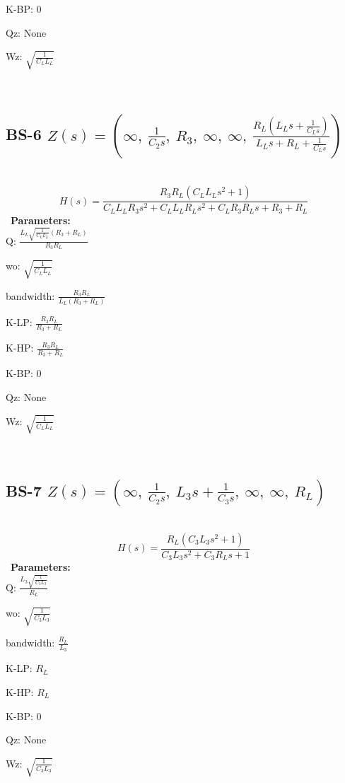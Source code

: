 \documentclass{article}
\begin{document}
K-BP: $0$\ 

Qz: $\text{None}$\ 

Wz: $\sqrt{\frac{1}{C_{L} L_{L}}}$\ 

\ 

\subsection{BS-6 $Z(s) = \left( \infty, \  \frac{1}{C_{2} s}, \  R_{3}, \  \infty, \  \infty, \  \frac{R_{L} \left(L_{L} s + \frac{1}{C_{L} s}\right)}{L_{L} s + R_{L} + \frac{1}{C_{L} s}}\right)$ } \ 
\textbf{\[H(s) = \frac{R_{3} R_{L} \left(C_{L} L_{L} s^{2} + 1\right)}{C_{L} L_{L} R_{3} s^{2} + C_{L} L_{L} R_{L} s^{2} + C_{L} R_{3} R_{L} s + R_{3} + R_{L}}\] } \ 
\textbf{Parameters:}\\ 

Q: $\frac{L_{L} \sqrt{\frac{1}{C_{L} L_{L}}} \left(R_{3} + R_{L}\right)}{R_{3} R_{L}}$\ 

wo: $\sqrt{\frac{1}{C_{L} L_{L}}}$\ 

bandwidth: $\frac{R_{3} R_{L}}{L_{L} \left(R_{3} + R_{L}\right)}$\ 

K-LP: $\frac{R_{3} R_{L}}{R_{3} + R_{L}}$\ 

K-HP: $\frac{R_{3} R_{L}}{R_{3} + R_{L}}$\ 

K-BP: $0$\ 

Qz: $\text{None}$\ 

Wz: $\sqrt{\frac{1}{C_{L} L_{L}}}$\ 

\ 

\subsection{BS-7 $Z(s) = \left( \infty, \  \frac{1}{C_{2} s}, \  L_{3} s + \frac{1}{C_{3} s}, \  \infty, \  \infty, \  R_{L}\right)$ } \ 
\textbf{\[H(s) = \frac{R_{L} \left(C_{3} L_{3} s^{2} + 1\right)}{C_{3} L_{3} s^{2} + C_{3} R_{L} s + 1}\] } \ 
\textbf{Parameters:}\\ 

Q: $\frac{L_{3} \sqrt{\frac{1}{C_{3} L_{3}}}}{R_{L}}$\ 

wo: $\sqrt{\frac{1}{C_{3} L_{3}}}$\ 

bandwidth: $\frac{R_{L}}{L_{3}}$\ 

K-LP: $R_{L}$\ 

K-HP: $R_{L}$\ 

K-BP: $0$\ 

Qz: $\text{None}$\ 

Wz: $\sqrt{\frac{1}{C_{3} L_{3}}}$\ 
\end{document}
